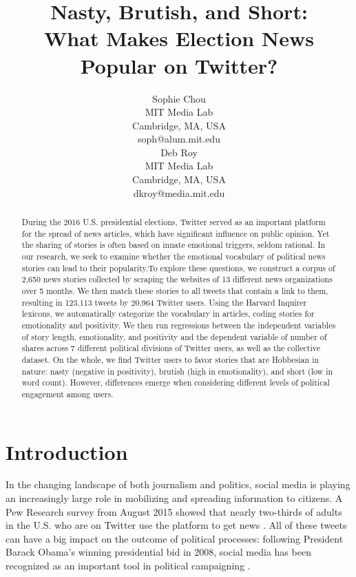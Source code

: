 \documentclass[letterpaper]{article}
\begin{document}
%
\title{Nasty, Brutish, and Short:\\
What Makes Election News Popular on Twitter?}
\author{Sophie Chou\\
MIT Media Lab\\
Cambridge, MA, USA\\
soph@alum.mit.edu\\
\And
Deb Roy\\
MIT Media Lab\\
Cambridge, MA, USA\\
dkroy@media.mit.edu\\
}
\maketitle
\begin{abstract}
During the 2016 U.S. presidential elections, Twitter served as an important platform for the spread of news articles, which have significant influence on public opinion. Yet the sharing of stories is often based on innate emotional triggers, seldom rational. In our research, we seek to examine whether the emotional vocabulary of political news stories can lead to their popularity.To explore these questions, we construct a corpus of 2,650 news stories collected by scraping the websites of 13 different news organizations over 5 months. We then match these stories to all tweets that contain a link to them, resulting in 123,113 tweets by 20,964 Twitter users. Using the Harvard Inquirer lexicons, we automatically categorize the vocabulary in articles, coding stories for emotionality and positivity. We then run regressions between the independent variables of story length, emotionality, and positivity and the dependent variable of number of shares across 7 different political divisions of Twitter users, as well as the collective dataset. On the whole, we find Twitter users to favor stories that are Hobbesian in nature: nasty (negative in positivity), brutish (high in emotionality), and short (low in word count). However, differences emerge when considering different levels of political engagement among users.

\end{abstract}

 
\section{Introduction}
In the changing landscape of both journalism and politics, social media is playing an increasingly large role in mobilizing and spreading information to citizens. A Pew Research survey from August 2015 showed that nearly two-thirds of adults in the U.S. who are on Twitter use the platform to get news \cite{pew-Twitter-news}. All of these tweets can have a big impact on the outcome of political processes: following President Barack Obama's winning presidential bid in 2008, social media has been recognized as an important tool in political campaigning \cite{cogburn2011networked}. %
 
\end{document}
